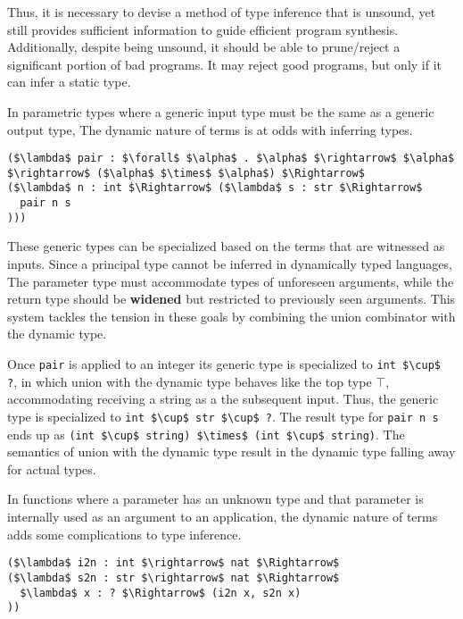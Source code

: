 \documentclass[sigplan,screen]{acmart}
\begin{document}
Thus, it is necessary to devise a method of type inference that is unsound, 
yet still provides sufficient information to guide efficient program synthesis.
Additionally, despite being unsound, it should be able to prune/reject 
a significant portion of bad programs. 
It may reject good programs, but only if it can infer a static type.

In parametric types where a generic input type must be the same as a generic output type,
The dynamic nature of terms is at odds with inferring types.


\begin{lstlisting}
($\lambda$ pair : $\forall$ $\alpha$ . $\alpha$ $\rightarrow$ $\alpha$ $\rightarrow$ ($\alpha$ $\times$ $\alpha$) $\Rightarrow$ 
($\lambda$ n : int $\Rightarrow$ ($\lambda$ s : str $\Rightarrow$ 
  pair n s
)))
\end{lstlisting}

\noindent These generic types can be specialized based on the terms that are witnessed as inputs. 
Since a principal type cannot be inferred in dynamically typed languages, 
The parameter type must accommodate types of unforeseen arguments, 
while the return type should be \textbf{widened} but restricted 
to previously seen arguments.
This system tackles the tension in these goals by combining the union combinator  
with the dynamic type. 

Once \lstinline{pair} is applied to an integer its generic type is specialized to 
\lstinline{int $\cup$ ?}, 
in which union with the dynamic type behaves like the top type $\top$, 
accommodating receiving a string as a the subsequent input.
Thus, the generic type is specialized to \lstinline{int $\cup$ str $\cup$ ?}.
The result type for \lstinline{pair n s} ends up as 
\lstinline{(int $\cup$ string) $\times$ (int $\cup$ string)}. 
The semantics of union with the dynamic type result in the dynamic type 
falling away for actual types.

In functions where a parameter has an unknown type and that parameter is 
internally used as an argument to an application, the dynamic nature of terms  
adds some complications to type inference.

\begin{lstlisting}
($\lambda$ i2n : int $\rightarrow$ nat $\Rightarrow$ 
($\lambda$ s2n : str $\rightarrow$ nat $\Rightarrow$ 
  $\lambda$ x : ? $\Rightarrow$ (i2n x, s2n x)
))

\end{lstlisting}
\end{document}
